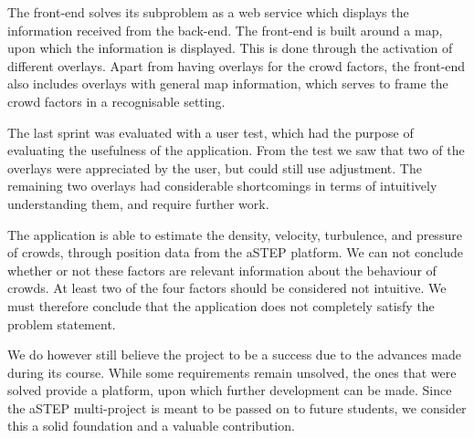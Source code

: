 The front-end solves its subproblem as a web service which displays the information received from the back-end. The front-end is built around a map, upon which the information is displayed. This is done through the activation of different overlays. Apart from having overlays for the crowd factors, the front-end also includes overlays with general map information, which serves to frame the crowd factors in a recognisable setting.

The last sprint was evaluated with a user test, which had the purpose of evaluating the usefulness of the application. From the test we saw that two of the overlays were appreciated by the user, but could still use adjustment. The remaining two overlays had considerable shortcomings in terms of intuitively understanding them, and require further work.

The application is able to estimate the density, velocity, turbulence, and pressure of crowds, through position data from the aSTEP platform. We can not conclude whether or not these factors are relevant information about the behaviour of crowds. At least two of the four factors should be considered not intuitive. We must therefore conclude that the application does not completely satisfy the problem statement.

We do however still believe the project to be a success due to the advances made during its course. While some requirements remain unsolved, the ones that were solved provide a platform, upon which further development can be made. Since the aSTEP multi-project is meant to be passed on to future students, we consider this a solid foundation and a valuable contribution.




